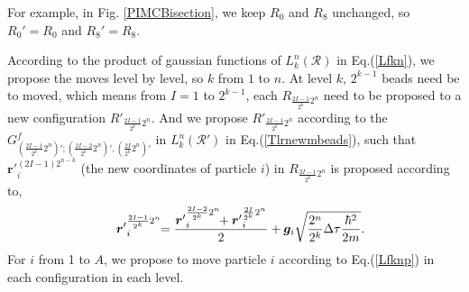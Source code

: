 \documentclass[12pt,letterpaper,UTF8]{report}
\begin{document}
\begin{description}
For example, in Fig. \ref{PIMCBisection},  we keep $R_0$ and $R_8$ unchanged, so $R_0'=R_0$ and $R_8'=R_8$.

  \item[Step 3] According to the product of gaussian functions of $L^n_k(\mathcal{R})$ in Eq.(\ref{Lfkn}), we propose the moves level by level, so $k$ from $1$ to $n$. At level $k$, $2^{k-1}$ beads need be to moved, which means from $I=1$ to $2^{k-1}$, each $R_{\frac{2I-1}{2^k}{2^{n}}}$ need to be proposed to a new configuration $R'_{\frac{2I-1}{2^k}{2^{n}}}$. And we propose $R'_{\frac{2I-1}{2^k}{2^{n}}}$ according to the
      $ G^f_{\left(\frac{2I-1}{2^k}2^{n}\right)'; \left(\frac{2I-2}{2^k}2^{n}\right)', \left(\frac{2I}{2^k}2^{n}\right)'} $ in $ L^n_k(\mathcal{R}') $ in Eq.(\ref{Tlrnewmbeads}), such that ${\bm{r}'}_i^{{(2I-1){2^{n-k}}}}$ (the new coordinates of particle $i$) in $R_{\frac{2I-1}{2^k}{2^{n}}}$ is proposed according to,
  \begin{equation}
  {\bm{r}'}_i^{{\frac{2I-1}{2^{k}}{2^{n}}}} \!\!=
  \frac{ {\bm{r}'}_i^{\frac{2I-2}{2^{k}}{2^{n}}} \!\! + {\bm{r}'}_i^{\frac{2I}{2^{k}}{2^{n}}}      }{2}
  + \bm{g}_i \sqrt{ \frac{2^n}{2^k}\Delta \tau \frac{\hbar^2}{2m}} .
 \label{Lfknp}
\hspace{-1em}
\end{equation}
For $i$ from 1 to $A$, we propose to move particle $i$ according to Eq.(\ref{Lfknp}) in each configuration in each level.


\end{description}
\end{document}
